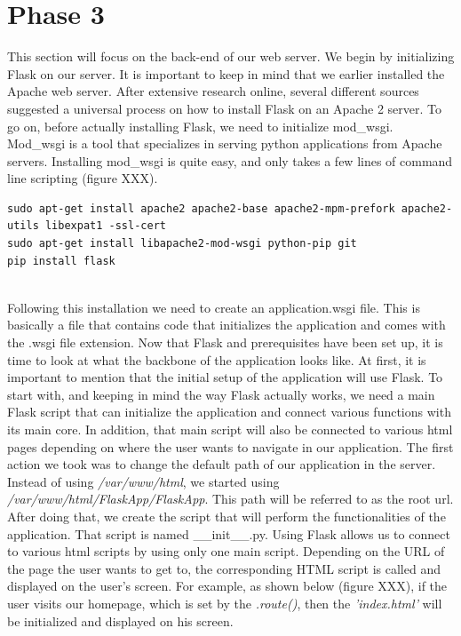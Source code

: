 \section{Phase 3}
This section will focus on the back-end of our web server. We begin by initializing Flask on our server. It is important to keep in mind that we earlier installed the Apache web server. After extensive research online, several different sources suggested a universal process on how to install Flask on an Apache 2 server. To go on, before actually installing Flask, we need to initialize mod\_wsgi. Mod\_wsgi is a tool that specializes in serving python applications from Apache servers. Installing mod\_wsgi is quite easy, and only takes a few lines of command line scripting (figure XXX).\\

\begin{lstlisting}
sudo apt-get install apache2 apache2-base apache2-mpm-prefork apache2-utils libexpat1 -ssl-cert
sudo apt-get install libapache2-mod-wsgi python-pip git
pip install flask
\end{lstlisting}\\

Following this installation we need to create an application.wsgi file. This is basically a file that contains code that initializes the application and comes with the .wsgi file extension. 
Now that Flask and prerequisites have been set up, it is time to look at what the backbone of the application looks like. At first, it is important to mention that the initial setup of the application will use Flask. To start with, and keeping in mind the way Flask actually works, we need a main Flask script that can initialize the application and connect various functions with its main core. In addition, that main script will also be connected to various html pages depending on where the user wants to navigate in our application.
The first action we took was to change the default path of our application in the server. Instead of using \textit{/var/www/html}, we started using \textit{/var/www/html/FlaskApp/FlaskApp}. This path will be referred to as the root url. After doing that, we create the script that will perform the functionalities of the application. That script is named \_\_init\_\_.py. Using Flask allows us to connect to various html scripts by using  only one main script. Depending on the URL of the page the user wants to get to, the corresponding HTML script is called and displayed on the user's screen. For example, as shown below (figure XXX), if the user visits our homepage, which is set by the \textit{\@app.route()}, then the \textit{'index.html'} will be initialized and displayed on his screen.\\

